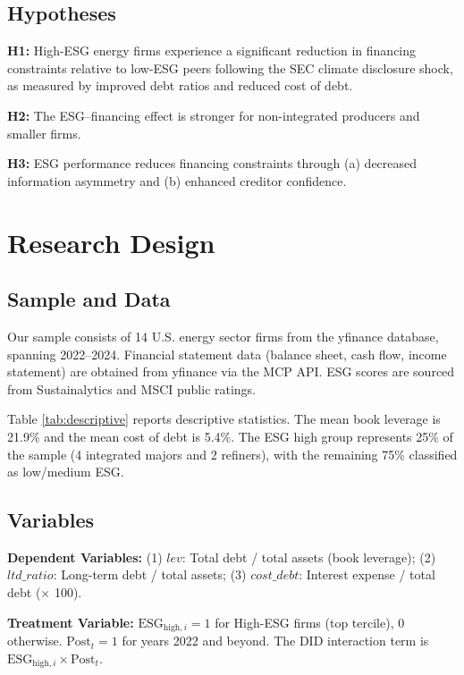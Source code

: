 \documentclass[11pt,a4paper]{article}
\begin{document}
\subsection{Hypotheses}

\textbf{H1:} High-ESG energy firms experience a significant reduction in financing constraints relative to low-ESG peers following the SEC climate disclosure shock, as measured by improved debt ratios and reduced cost of debt.

\textbf{H2:} The ESG--financing effect is stronger for non-integrated producers and smaller firms.

\textbf{H3:} ESG performance reduces financing constraints through (a) decreased information asymmetry and (b) enhanced creditor confidence.

\section{Research Design}

\subsection{Sample and Data}

Our sample consists of 14 U.S. energy sector firms from the yfinance database, spanning 2022--2024. Financial statement data (balance sheet, cash flow, income statement) are obtained from yfinance via the MCP API. ESG scores are sourced from Sustainalytics and MSCI public ratings.

Table \ref{tab:descriptive} reports descriptive statistics. The mean book leverage is 21.9\% and the mean cost of debt is 5.4\%. The ESG high group represents 25\% of the sample (4 integrated majors and 2 refiners), with the remaining 75\% classified as low/medium ESG.

\subsection{Variables}

\textbf{Dependent Variables:} (1) $\mathit{lev}$: Total debt / total assets (book leverage); (2) $\mathit{ltd\_ratio}$: Long-term debt / total assets; (3) $\mathit{cost\_debt}$: Interest expense / total debt ($\times$ 100).

\textbf{Treatment Variable:} $\mathrm{ESG}_{\mathrm{high},i} = 1$ for High-ESG firms (top tercile), 0 otherwise. $\mathrm{Post}_t = 1$ for years 2022 and beyond. The DID interaction term is $\mathrm{ESG}_{\mathrm{high},i} \times \mathrm{Post}_t$.
\end{document}

